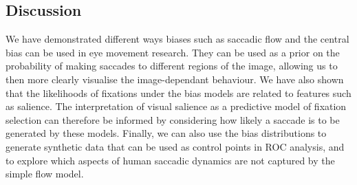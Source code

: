 \subsection{Discussion}

We have demonstrated different ways biases such as saccadic flow and the central bias can be used in eye movement research. They can be used as a prior on the probability of making saccades to different regions of the image, allowing us to then more clearly visualise the image-dependant behaviour. We have also shown that the likelihoods of fixations under the bias models are related to features such as salience. The interpretation of visual salience as a predictive model of fixation selection can therefore be informed by considering how likely a saccade is to be generated by these models. Finally, we can also use the bias distributions to generate synthetic data that can be used as control points in ROC analysis, and to explore which aspects of human saccadic dynamics are not captured by the simple flow model. 
